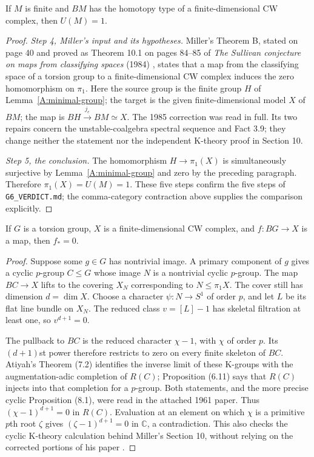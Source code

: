 \begin{theorem}\label{A:finite-dimension}
If $M$ is finite and $BM$ has the homotopy type of a finite-dimensional CW
complex, then $U(M)=1$.
\end{theorem}
\begin{proof}
\emph{Step 4, Miller's input and its hypotheses.}
Miller's Theorem B, stated on page 40 and proved as Theorem 10.1 on pages
84--85 of \emph{The Sullivan conjecture on maps from classifying spaces}
(1984) \cite{miller1984}, states that a map from the classifying space of a torsion group to a
finite-dimensional CW complex induces the zero homomorphism on $\pi_1$.
Here the source group is the finite group $H$ of Lemma~\ref{A:minimal-group};
the target is the given finite-dimensional model $X$ of $BM$; the map is
$BH\xrightarrow{j_e}BM\simeq X$. The 1985 correction \cite{miller1985} was read in full. Its two
repairs concern the unstable-coalgebra spectral sequence and Fact 3.9; they
change neither the statement nor the independent K-theory proof in Section 10.

\emph{Step 5, the conclusion.}
The homomorphism $H\to\pi_1(X)$ is simultaneously surjective by
Lemma~\ref{A:minimal-group} and zero by the preceding paragraph. Therefore
$\pi_1(X)=U(M)=1$. These five steps confirm the five steps of
\texttt{G6\_VERDICT.md}; the comma-category contraction above supplies the
comparison explicitly.
\end{proof}

\begin{proposition}\label{A:atiyah}
If $G$ is a torsion group, $X$ is a finite-dimensional CW complex, and
$f:BG\to X$ is a map, then $f_*=0$.
\end{proposition}
\begin{proof}
Suppose some $g\in G$ has nontrivial image. A primary component of $g$ gives a
cyclic $p$-group $C\leq G$ whose image $N$ is a nontrivial cyclic $p$-group.
The map $BC\to X$ lifts to the covering $X_N$ corresponding to $N\leq\pi_1X$.
The cover still has dimension $d=\dim X$. Choose a character $\psi:N\to S^1$
of order $p$, and let $L$ be its flat line bundle on $X_N$. The reduced class
$v=[L]-1$ has skeletal filtration at least one, so $v^{d+1}=0$.

The pullback to $BC$ is the reduced character $\chi-1$, with $\chi$ of order
$p$. Its $(d+1)$st power therefore restricts to zero on every finite skeleton
of $BC$. Atiyah's Theorem (7.2) identifies the inverse limit of these K-groups
with the augmentation-adic completion of $R(C)$; Proposition (6.11) says that
$R(C)$ injects into that completion for a $p$-group. Both statements, and the
more precise cyclic Proposition (8.1), were read in the attached 1961 paper.
Thus $(\chi-1)^{d+1}=0$ in $R(C)$. Evaluation at an element on which $\chi$ is a
primitive $p$th root $\zeta$ gives $(\zeta-1)^{d+1}=0$ in $\mathbb C$, a
contradiction. This also checks the cyclic K-theory calculation behind
Miller's Section 10, without relying on the corrected portions of his paper
\cite{atiyah1961}.
\end{proof}

